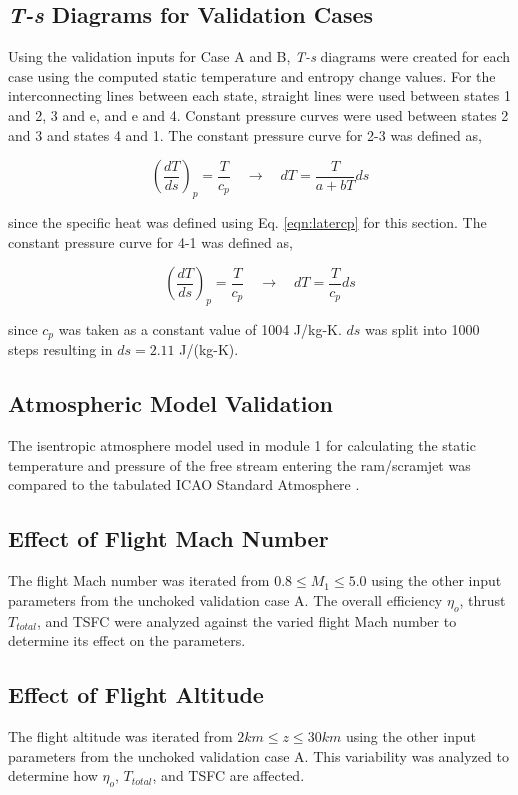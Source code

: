 \documentclass[conf]{new-aiaa} %
\begin{document}
\subsection{\textit{T-s} Diagrams for Validation Cases} %
Using the validation inputs for Case A and B, \textit{T-s} diagrams were created for each case using the computed static temperature and entropy change values. For the interconnecting lines between each state, straight lines were used between states 1 and 2, 3 and e, and e and 4. Constant pressure curves were used between states 2 and 3 and states 4 and 1. The constant pressure curve for 2-3 was defined as,

\begin{equation}
    \label{eqn:constp_23}
    \left(\frac{dT}{ds}\right)_p=\frac{T}{c_p} \quad \rightarrow \quad dT=\frac{T}{a+bT}ds
\end{equation}

since the specific heat was defined using Eq. \ref{eqn:latercp} for this section. The constant pressure curve for 4-1 was defined as,

\begin{equation}
    \label{eqn:constp_41}
    \left(\frac{dT}{ds}\right)_p=\frac{T}{c_p} \quad \rightarrow \quad dT=\frac{T}{c_p}ds
\end{equation}

since $c_p$ was taken as a constant value of 1004 J/kg-K. $ds$ was split into 1000 steps resulting in $ds=2.11$ J/(kg-K).

\subsection{Atmospheric Model Validation} %
The isentropic atmosphere model used in module 1 for calculating the static temperature and pressure of the free stream entering the ram/scramjet was compared to the tabulated ICAO Standard Atmosphere \cite{hill1992propulsion}.

\subsection{Effect of Flight Mach Number} %
The flight Mach number was iterated from $0.8\leq M_1\leq 5.0$ using the other input parameters from the unchoked validation case A. The overall efficiency $\eta_o$, thrust $T_{total}$, and TSFC were analyzed against the varied flight Mach number to determine its effect on the parameters.

\subsection{Effect of Flight Altitude} %
The flight altitude was iterated from $2 km \leq z \leq 30 km$ using the other input parameters from the unchoked validation case A. This variability was analyzed to determine how $\eta_o$, $T_{total}$, and TSFC are affected.
\end{document}
